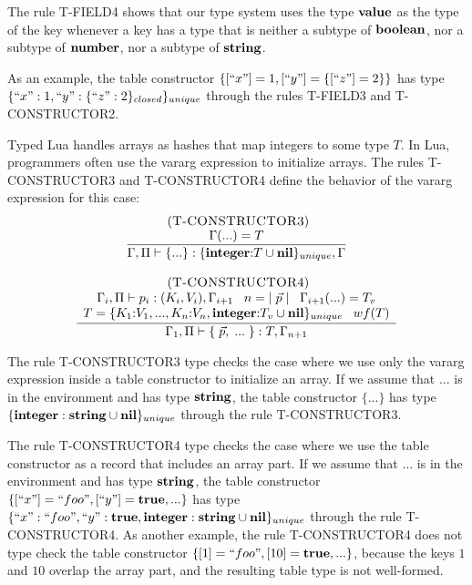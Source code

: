 The rule \textsc{T-FIELD4} shows that our type system uses the type $\mathbf{value}$
as the type of the key whenever a key has a type that is neither a
subtype of $\mathbf{boolean}$, nor a subtype of $\mathbf{number}$, nor a subtype of $\mathbf{string}$.

As an example, the table constructor $\{[``x"] = 1, [``y"] = \{[``z"] = 2\}\}$
has type $\{``x":1, ``y":\{``z":2\}_{closed}\}_{unique}$ through the rules
\textsc{T-FIELD3} and \textsc{T-CONSTRUCTOR2}.

Typed Lua handles arrays as hashes that map integers to some type $T$.
In Lua, programmers often use the vararg expression to initialize arrays.
The rules \textsc{T-CONSTRUCTOR3} and \textsc{T-CONSTRUCTOR4} define
the behavior of the vararg expression for this case:
\[
\begin{array}{c}
\begin{array}{c}
\; (\textsc{T-CONSTRUCTOR3})\\
\dfrac{\Gamma({...}) = T}
      {\Gamma, \Pi \vdash \{{...}\}:\{\mathbf{integer}{:}T \cup \mathbf{nil}\}_{unique}, \Gamma}
\end{array}
\\ \\
\begin{array}{c}
\; (\textsc{T-CONSTRUCTOR4})\\
\dfrac{\begin{array}{c}
       \Gamma_{i}, \Pi \vdash p_{i}:(K_{i},V_{i}), \Gamma_{i+1} \;\;\;
       n = |\;\vec{p}\;| \;\;\;
       \Gamma_{i+1}({...}) = T_{v}\\
       T = \{K_{1}{:}V_{1}, ..., K_{n}{:}V_{n}, \mathbf{integer}{:}T_{v} \cup \mathbf{nil}\}_{unique} \;\;\;
       wf(T)
       \end{array}}
      {\Gamma_{1}, \Pi \vdash \{\;\vec{p},\;{...}\;\}:T, \Gamma_{n+1}}
\end{array}
\end{array}
\]

The rule \textsc{T-CONSTRUCTOR3} type checks the case where we use
only the vararg expression inside a table constructor to initialize
an array.
If we assume that $...$ is in the environment and has type $\mathbf{string}$,
the table constructor $\{{...}\}$ has type $\{\mathbf{integer}:\mathbf{string} \cup \mathbf{nil}\}_{unique}$
through the rule \textsc{T-CONSTRUCTOR3}.

The rule \textsc{T-CONSTRUCTOR4} type checks the case where we use
the table constructor as a record that includes an array part.
If we assume that $...$ is in the environment and has type $\mathbf{string}$,
the table constructor $\{[``x"] = ``foo", [``y"] = \mathbf{true}, {...}\}$
has type $\{``x":``foo", ``y":\mathbf{true}, \mathbf{integer}:\mathbf{string} \cup \mathbf{nil}\}_{unique}$
through the rule \textsc{T-CONSTRUCTOR4}.
As another example, the rule \textsc{T-CONSTRUCTOR4} does not type check
the table constructor $\{ [1] = ``foo", [10] = \mathbf{true}, {...} \}$,
because the keys $1$ and $10$ overlap the array part,
and the resulting table type is not well-formed.

